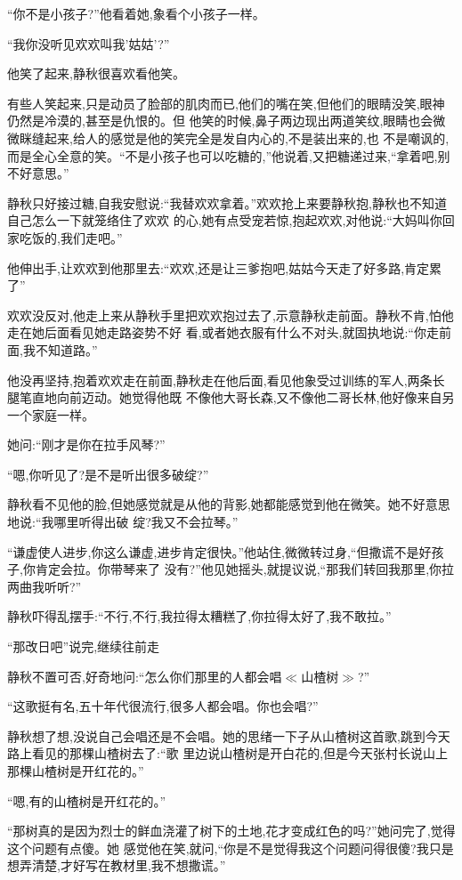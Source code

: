 ﻿\documentclass[12pt]{article}
\begin{document}
``你不是小孩子?''他看着她,象看个小孩子一样。

``我\myrule 你没听见欢欢叫我'姑姑'?''

他笑了起来,静秋很喜欢看他笑。

有些人笑起来,只是动员了脸部的肌肉而已,他们的嘴在笑,但他们的眼睛没笑,眼神仍然是冷漠的,甚至是仇恨的。但
他笑的时候,鼻子两边现出两道笑纹,眼睛也会微微眯缝起来,给人的感觉是他的笑完全是发自内心的,不是装出来的,也
不是嘲讽的,而是全心全意的笑。``不是小孩子也可以吃糖的,''他说着,又把糖递过来,``拿着吧,别不好意思。''

静秋只好接过糖,自我安慰说:``我替欢欢拿着。''欢欢抢上来要静秋抱,静秋也不知道自己怎么一下就笼络住了欢欢
的心,她有点受宠若惊,抱起欢欢,对他说:``大妈叫你回家吃饭的,我们走吧。''

他伸出手,让欢欢到他那里去:``欢欢,还是让三爹抱吧,姑姑今天走了好多路,肯定累了\myrule ''

欢欢没反对,他走上来从静秋手里把欢欢抱过去了,示意静秋走前面。静秋不肯,怕他走在她后面看见她走路姿势不好
看,或者她衣服有什么不对头,就固执地说:``你走前面,我\myrule 不知道路。''

他没再坚持,抱着欢欢走在前面,静秋走在他后面,看见他象受过训练的军人,两条长腿笔直地向前迈动。她觉得他既
不像他大哥长森,又不像他二哥长林,他好像来自另一个家庭一样。

她问:``刚才是你\myrule 在拉手风琴?''

``嗯,你听见了?是不是听出很多破绽?''

静秋看不见他的脸,但她感觉就是从他的背影,她都能感觉到他在微笑。她不好意思地说:``我\myrule 哪里听得出破
绽?我又不会拉琴。''

``谦虚使人进步,你这么谦虚,进步肯定很快。''他站住,微微转过身,``但撒谎不是好孩子,你肯定会拉。你带琴来了
没有?''他见她摇头,就提议说,``那我们转回我那里,你拉两曲我听听?''

静秋吓得乱摆手:``不行,不行,我拉得太糟糕了,你拉得\myrule 太好了,我不敢拉。''

``那改日吧\myrule ''说完,继续往前走

静秋不置可否,好奇地问:``怎么你们那里的人都会唱$\ll$山楂树$\gg$?''

``这歌挺有名,五十年代很流行,很多人都会唱。你也会唱?''

静秋想了想,没说自己会唱还是不会唱。她的思绪一下子从山楂树这首歌,跳到今天路上看见的那棵山楂树去了:``歌
里边说\myrule 山楂树是开白花的,但是今天张村长说\myrule 山上那棵山楂树是开\myrule 红花的。''

``嗯,有的山楂树是开红花的。''

``那树\myrule 真的是因为烈士的鲜血浇灌了树下的土地,花才变成红色的吗?''她问完了,觉得这个问题有点傻。她
感觉他在笑,就问,``你是不是觉得我这个问题问得很傻?我只是想弄清楚,才好写在教材里,我不想撒谎。''
\end{document}
